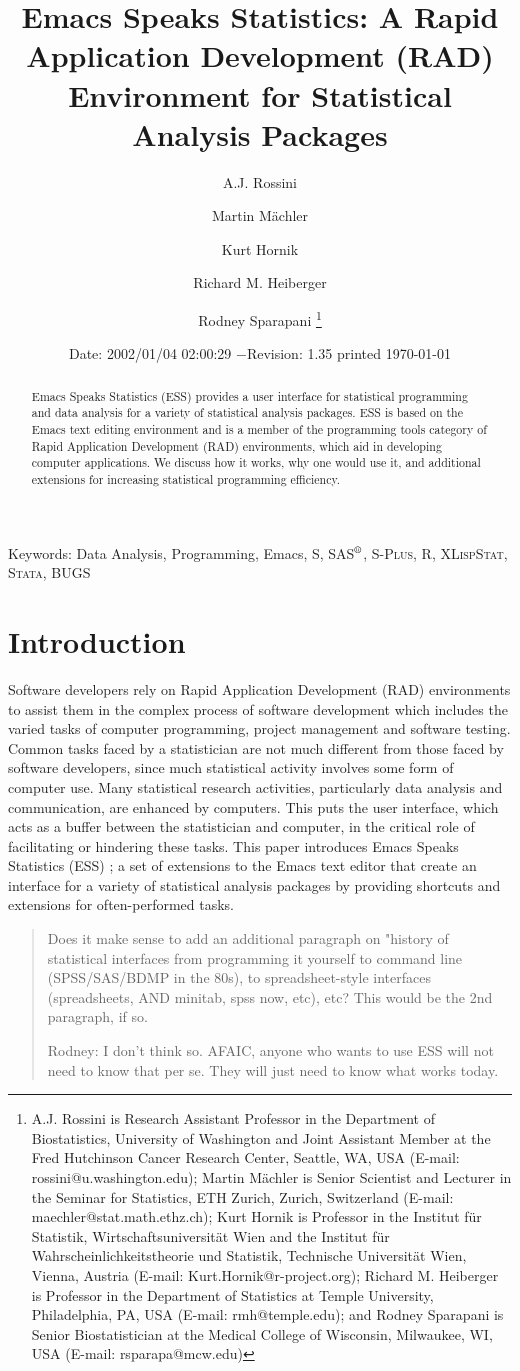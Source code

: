 \documentclass{article}
\title{Emacs Speaks Statistics:  A Rapid Application Development (RAD)
  Environment for Statistical Analysis Packages}
\author{A.J. Rossini \and Martin M{\"a}chler \and Kurt Hornik \and Richard
  M. Heiberger \and Rodney Sparapani \footnote{%
    A.J. Rossini is Research Assistant Professor in the Department of
    Biostatistics, University of Washington and Joint Assistant Member at
    the Fred Hutchinson Cancer Research Center, Seattle, WA, USA
    (E-mail: rossini@u.washington.edu);
    Martin M{\"a}chler is Senior Scientist and Lecturer in the Seminar for
    Statistics, ETH Zurich, Zurich, Switzerland
    (E-mail: maechler@stat.math.ethz.ch);
    Kurt Hornik is Professor in the Institut f{\"u}r Statistik,
    Wirtschaftsuniversit{\"a}t Wien and the Institut f{\"u}r
    Wahrscheinlichkeitstheorie und Statistik, Technische Universit{\"a}t
    Wien, Vienna, Austria (E-mail: Kurt.Hornik@r-project.org);
    Richard M. Heiberger is Professor in the Department of Statistics at
    Temple University, Philadelphia, PA, USA (E-mail: rmh@temple.edu);
    and Rodney Sparapani is Senior Biostatistician at the Medical College
    of Wisconsin, Milwaukee, WI, USA (E-mail: rsparapa@mcw.edu)}}
\date{$ $Date: 2002/01/04 02:00:29 $ - $Revision: 1.35 $ $\tiny printed \today}
\newcommand*{\SAS}{\textsc{SAS}$^{\mbox{\scriptsize\textregistered}}$}
\newcommand*{\Splus}{\textsc{S-Plus}}
\newcommand*{\XLispStat}{\textsc{XLispStat}}
\newcommand*{\Stata}{\textsc{Stata}}
\begin{document}
\maketitle

\begin{abstract}
  Emacs Speaks Statistics (ESS) provides a user interface for
  statistical programming and data analysis for a variety
  of statistical analysis packages.  ESS
  is based on the Emacs text editing environment and is a member of
  the programming tools category of Rapid Application
  Development (RAD) environments, which aid in developing
  computer applications.  We discuss how it works, why one
  would use it, and additional extensions for increasing
  statistical programming efficiency.
\end{abstract}

\noindent Keywords: Data Analysis, Programming, Emacs, S, \SAS,
\Splus, R, \XLispStat, \Stata, BUGS

\baselineskip=2pc

\section{Introduction}
\label{sec:introduction}

Software developers rely on Rapid Application Development (RAD)
environments to assist them in the complex process of software
development which includes the varied tasks of computer
programming, project management and software testing.
Common tasks faced by a statistician are not much different from those
faced by software developers, since much statistical
activity involves some form of computer use.  Many
statistical research activities, particularly data analysis and
communication, are enhanced by computers.  This puts the user
interface, which acts as a buffer between the statistician and
computer, in the critical role of facilitating or hindering these
tasks.  This paper introduces Emacs Speaks Statistics (ESS) \citep{ESS};
a set of extensions to the Emacs text editor that create an interface
for a variety of statistical analysis packages by
providing shortcuts and extensions for often-performed tasks.

\begin{quote}
 Does it make sense to add an additional paragraph on "history of
statistical interfaces from programming it yourself to command line
(SPSS/SAS/BDMP in the 80s), to spreadsheet-style interfaces
(spreadsheets, AND minitab, spss now, etc), etc?  This would be the
2nd paragraph, if so.

Rodney:  I don't think so.
AFAIC, anyone who wants to use ESS will not need to know
that per se.  They will just need to know what works today.
\end{quote}
\end{document}
